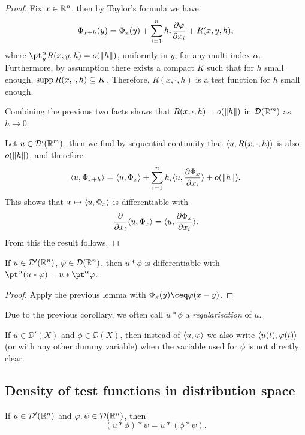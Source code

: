 \begin{proof}
    Fix $x \in \mathbb R^n$, then by Taylor's formula we have
    \[
    \Phi_{x + h}(y) = \Phi_x(y) + \sum_{i=1}^n h_i \pdv{\varphi}{x_i} (x, y)+ R(x, y, h), 
    \]
    where $\pt_y^\alpha R(x, y, h) = o(\norm{h})$, uniformly in $y$, for any multi-index $\alpha$. Furthermore, by assumption there exists a compact $K$ such that for $h$ small enough, $\operatorname{supp} R(x, \cdot, h) \subseteq K$. Therefore, $R(x, \cdot, h)$ is a test function for $h$ small enough.
    
    Combining the previous two facts shows that $R(x, \cdot, h) = o(\norm{h})$ in $\mathcal D(\mathbb R^m)$ as $h \to 0$. 
    
    Let $u \in \mathcal D'(\mathbb R^m)$, then we find by sequential continuity that $\langle u, R(x, \cdot, h)\rangle$ is also $o(\norm{h})$, and therefore
    \[
    \langle u, \Phi_{x+h}\rangle = \langle u, \Phi_x\rangle + \sum_{i=1}^n h_i \langle u, \pdv{\Phi_x}{x_i}\rangle + o(\norm{h}). 
    \]
    This shows that $x \mapsto \langle u, \Phi_x\rangle$ is differentiable with 
    \[
    \pdv{x_i} \langle u, \Phi_x\rangle  = \langle u, \pdv{\Phi_x}{x_i}\rangle. 
    \]
    From this the result follows. 
\end{proof}

\begin{corollary}
    If $u \in \mathcal D'(\mathbb R^n)$, $\varphi \in \mathcal D(\mathbb R^n)$, then $u * \phi$ is differentiable with $\pt^\alpha (u * \phi) = u * \pt^\alpha\phi$. 
\end{corollary}

\begin{proof}
    Apply the previous lemma with $\Phi_x(y) \ceq  \phi(x-y)$. 
\end{proof}

Due to the previous corollary, we often call $u * \phi$ a \emph{regularisation} of $u$. 

\begin{convention}
	If $u \in \DD'(X)$ and $\phi \in \DD(X)$, then instead of $\langle u, \varphi\rangle$ we also write $\langle u(t), \varphi(t)\rangle$ (or with any other dummy variable) when the variable used for $\phi$ is not directly clear. 
\end{convention}

\subsection{Density of test functions in distribution space}
\begin{lemma}
	If $u \in \mathcal D'(\mathbb R^n)$ and $\varphi, \psi \in \mathcal D(\mathbb R^n)$, then
	\[
	(u * \phi) * \psi = u * (\phi * \psi). 
	\]
\end{lemma}

